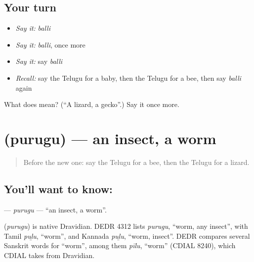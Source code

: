 \subsection*{Your turn}
\begin{itemize}
\raggedright
  \item \emph{Say it:} \emph{balli}
  \item \emph{Say it:} \emph{balli}, once more
  \item \emph{Say it:} say \emph{balli}
  \item \emph{Recall:} say the Telugu for a baby, then the Telugu for a bee, then say \emph{balli} again
\end{itemize}

\begin{tcolorbox}[breakable,colback=teal!4,colframe=teal!35!black,title={Before you move on}]
What does  mean? (\textquotedblleft{}A lizard, a gecko\textquotedblright{}.) Say it once more.
\end{tcolorbox}
\section[\texorpdfstring{\te{పురుగు} (purugu)}{పురుగు (purugu)}]{ (purugu) — an insect, a worm}

\label{lesson:TE-C187-purugu}



\begin{quote}
Before the new one: say the Telugu for a bee, then the Telugu for a lizard.
\end{quote}

\subsection*{You'll want to know: }
\textbf{} — \emph{purugu} — \textquotedblleft{}an insect, a worm\textquotedblright{}.

\begin{cousinweb}
\textbf{} (\emph{purugu}) is native Dravidian. DEDR 4312 lists \emph{purugu}, \textquotedblleft{}worm, any insect\textquotedblright{}, with Tamil \emph{puḻu}, \textquotedblleft{}worm\textquotedblright{}, and Kannada \emph{puḻu}, \textquotedblleft{}worm, insect\textquotedblright{}. DEDR compares several Sanskrit words for \textquotedblleft{}worm\textquotedblright{}, among them \emph{pīlu}, \textquotedblleft{}worm\textquotedblright{} (CDIAL 8240), which CDIAL takes from Dravidian.
\end{cousinweb}


